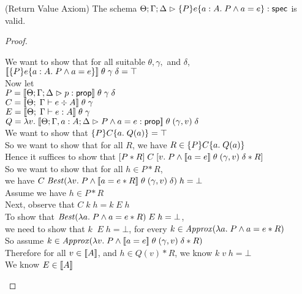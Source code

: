 \begin{lemma}{(Return Value Axiom)}
The schema $\judgeS{\spec{P}{e}{a:A}{P \land a = e}}$ is valid.
\end{lemma}

\begin{proof}
\begin{tabbedproof}
\oo We want to show that for all suitable $\theta, \gamma,$ and $\delta$, $\interp{\spec{P}{e}{a:A}{P \land a = e}}\;\theta\;\gamma\;\delta = \top$ \\
\oo Now let \\
\oox $P = \interp{\judgeA{p}{\assert}}\;\theta\;\gamma\;\delta$ \\
\oox $C = \interp{\judgeC[\Theta]{\Gamma}
                  {e}{A}} \;\theta
                          \;\gamma$ \\
\oox $E = \interp{\judgeE[\Theta]{\Gamma}
                  {e}{A}} \;\theta
                          \;\gamma$ \\
\oox $Q = \semfun{v}{\interp{\judgeA[\Theta; \Gamma, a:A; \Delta]{P \land a = e}{\assert}}\;\theta\;(\gamma, v)\;\delta}$ \\
\oo We want to show that $\spec{P}{C}{a}{Q(a)} = \top$ \\
\oo So we want to show that for all $R$, we have $R \in \spec{P}{C}{a}{Q(a)}$ \\
\oo Hence it suffices to show that $\basicspec{P * R}{C}{v}{P \land \interp{a = e}\;\theta\;(\gamma, v)\;\delta * R}$ \\
\oo So we want to show that for all $h \in P * R$, \\
\oox we have $C\;\mathit{Best}(\semfun{v}{P \land \interp{a = e * R}\;\theta\;(\gamma, v)\;\delta})\;h = \bot$ \\
\oo Assume we have $h \in P * R$ \\
\ooo Next, observe that $C\;k\;h = k\;E\;h$ \\
\ooo To show that $\mathit{Best}(\semfun{a}{P \land a = e * R})\;E\;h = \bot$, \\
\oox we need to show that $k\;\;E\;h = \bot$, for every $k \in \mathit{Approx}(\semfun{a}{P \land a = e *R})$ \\
\ooo So assume $k \in \mathit{Approx}(\semfun{v}{P \land \interp{a = e}\;\theta\;(\gamma, v)\;\delta * R})$ \\
\oooo Therefore for all $v \in \interp{A}$, and $h \in Q(v) * R$, we know $k\;v\;h = \bot$ \\
\oooo We know $E \in \interp{A}$ \\

\end{tabbedproof}
\end{proof}
